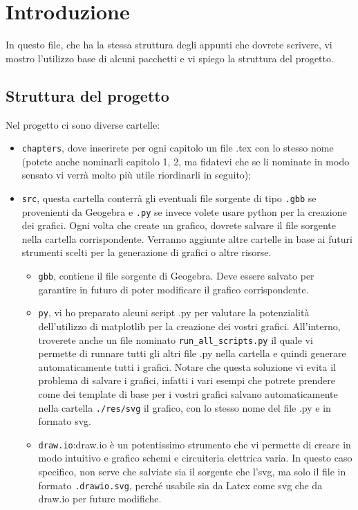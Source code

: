 \chapter{Introduzione}

In questo file, che ha la stessa struttura degli appunti che dovrete scrivere, vi mostro l'utilizzo base di alcuni pacchetti e vi spiego la struttura del progetto.

\section{Struttura del progetto}

Nel progetto ci sono diverse cartelle:
\begin{itemize}
	\item \texttt{chapters}, dove inserirete per ogni capitolo un file .tex con lo stesso nome (potete anche nominarli capitolo 1, 2, ma fidatevi che se li nominate in modo sensato vi verrà molto più utile riordinarli in seguito);
	\item \texttt{src}, questa cartella conterrà gli eventuali file sorgente di tipo \texttt{.gbb} se provenienti da Geogebra e  \texttt{.py} se invece volete usare python per la creazione dei grafici. Ogni volta che create un grafico, dovrete salvare il file sorgente nella cartella corrispondente. Verranno aggiunte altre cartelle in base ai futuri strumenti scelti per la generazione di grafici o altre risorse.
	\begin{itemize}
		\item \texttt{gbb}, contiene il file sorgente di Geogebra. Deve essere salvato per garantire in futuro di poter modificare il grafico corrispondente.
		\item \texttt{py}, vi ho preparato alcuni script .py per valutare la potenzialità dell'utilizzo di matplotlib per la creazione dei vostri grafici. All'interno, troverete anche un file nominato \texttt{run\_all\_scripts.py} il quale vi permette di runnare tutti gli altri file .py nella cartella e quindi generare automaticamente tutti i grafici. Notare che questa soluzione vi evita il problema di salvare i grafici, infatti i vari esempi che potrete prendere come dei template di base per i vostri grafici salvano automaticamente nella cartella \texttt{./res/svg} il grafico, con lo stesso nome del file .py e in formato svg.
		\item \texttt{draw.io}:draw.io è un potentissimo strumento che vi permette di creare in modo intuitivo e grafico schemi e circuiteria elettrica varia. In questo caso specifico, non serve che salviate sia il sorgente che l'svg, ma solo il file in formato \texttt{.drawio.svg}, perché usabile sia da Latex come svg che da draw.io per future modifiche.

\end{itemize}
\end{itemize}
